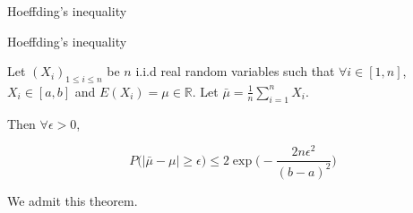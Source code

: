 \documentclass[usenames,dvipsnames]{beamer}
\begin{document}
\begin{frame}{Hoeffding's inequality}

\begin{theorem}{Hoeffding's inequality}

    Let $(X_i)_{1\leq i\leq n}$ be $n$ i.i.d real random variables such that $\forall i\in [1, n]$, $X_i\in [a,b]$ and $ E(X_i)= \mu \in \mathbb{R} $.  Let $	\bar{\mu} = \frac{1}{n} \sum^{n}_{i=1} X_i$.

    Then $\forall \epsilon >0$,

    \begin{equation*}
	P\Big(| \bar{\mu}-\mu|\geq \epsilon \Big) \leq 2 \exp\Big( -\frac{2n\epsilon^2}{(b-a)^2} \Big)
    \end{equation*}
\end{theorem}

We admit this theorem.
    
\end{frame}
\end{document}
